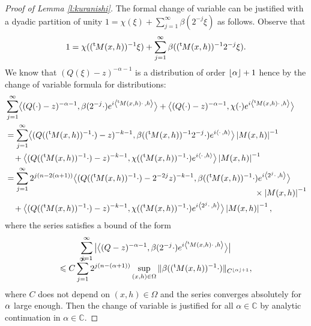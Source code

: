\documentclass[JEP,XML,SOM,Unicode]{cedram}
\theoremstyle{definition}
\newenvironment{refproof}[1]{\begin{proof}[Proof of {#1}]}{\end{proof}}
\let\cv\alpha
\let\Re\relax
\DeclareMathOperator{\Re}{Re}
\newcommand{\module}[1]{\left|#1\right|}
\newcommand{\plancher}[1]{\left \lfloor #1 \right \rfloor }
\newcommand\fantom{\\ &\phantom{=}\,}
\renewcommand{\t}{{{}^{\mathrm{t}\mkern-2mu}}}
\begin{document}
\begin{refproof}{Lemma \ref{l:kuranishi}}
The formal change of variable can be justified with a dyadic partition of unity $1=\chi(\xi)+\sum_{j=1}^\infty \beta(2^{-j}\xi)$ as follows.
Observe that
\[
1=\chi((\t M(x,h))^{-1}\xi)+\sum_{j=1}^\infty \beta((\t M(x,h))^{-1}2^{-j}\xi).
\]
We know that
$\left(Q(\xi)-z \right)^{-\cv-1}$ is a distribution of order $\plancher{\Re \cv}+1$ hence by the change of variable formula for
distributions:
\[
\begin{aligned}
&\sum_{j=1}^\infty\bigl\langle (Q(\cdot)-z)^{-\cv-1},\beta(2^{-j}\cdot) e^{i\left\langle \t M(x,h)\cdot\,,h\right\rangle} \bigr\rangle+\bigl\langle (Q(\cdot)-z)^{-\cv-1},\chi(\cdot) e^{i\left\langle \t M(x,h)\cdot\,,h\right\rangle} \bigr\rangle \\
&=\sum_{j=1}^\infty\bigl\langle (Q((\t M(x,h))^{-1}\cdot)-z)^{-k-1},\beta((\t M(x,h))^{-1}2^{-j}\cdot) e^{i\left\langle\cdot\,,h\right\rangle} \bigr\rangle \module{M(x,h)}^{-1}
\fantom + \bigl\langle (Q((\t M(x,h))^{-1}\cdot)-z)^{-k-1},\chi((\t M(x,h))^{-1}\cdot) e^{i\left\langle\cdot\,,h\right\rangle} \bigr\rangle \module{M(x,h)}^{-1}\\
&=\sum_{j=1}^\infty 2^{j(n-2(\cv+1))}\bigl\langle (Q((\t M(x,h))^{-1}\cdot)-2^{-2j}z)^{-k-1},\beta((\t M(x,h))^{-1}\cdot) e^{i\left\langle 2^j\cdot\,,h\right\rangle}\bigr\rangle\\[-10pt]
&\hspace*{10.5cm} \times\module{M(x,h)}^{-1}
\fantom + \bigl\langle (Q((\t M(x,h))^{-1}\cdot)-z)^{-k-1},\chi((\t M(x,h))^{-1}\cdot) e^{i\left\langle 2^j\cdot\,,h\right\rangle}\bigr\rangle \module{M(x,h)}^{-1},
\end{aligned}
\]
where the series satisfies a bound of the form
\begin{multline*}
\sum_{j=1}^\infty \big| \bigl\langle (Q-z)^{-\cv-1},\beta(2^{-j}\cdot) e^{i\left\langle \t M(x,h)\cdot\,,h\right\rangle} \bigr\rangle\big| \\[-10pt]\leqslant C \sum_{j=1}^\infty 2^{j(n-(\Re\cv+1))} \sup_{(x,h)\in \Omega} \Vert \beta((\t M(x,h))^{-1}\cdot)\Vert_{C^{\plancher{\Re\cv}+1}},
\end{multline*}
where $C$ does not depend on $(x,h)\in \Omega$ and the series converges absolutely for $\Re\cv$ large enough.
Then the change of variable is justified for all $\cv\in \mathbb{C}$ by analytic continuation in $\cv\in \mathbb{C}$.
\end{refproof}
\end{document}
